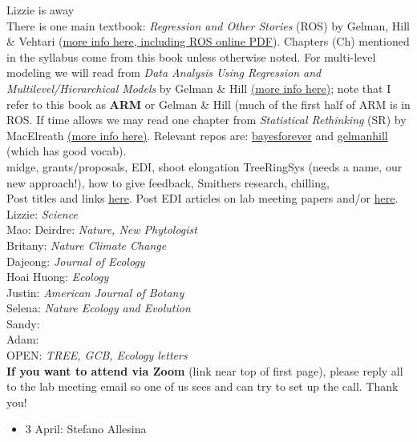 \documentclass[11pt]{article}
\newenvironment{smitemize}{
\begin{itemize}
  \setlength{\itemsep}{0pt}
  \setlength{\parskip}{0.8pt}
  \setlength{\parsep}{0pt}}
{\end{itemize}
}
\begin{document}
\noindent *Lizzie is away \\
There is one main textbook: \emph{Regression and Other Stories} (ROS) by Gelman, Hill \& Vehtari (\href{https://avehtari.github.io/ROS-Examples/}{more info here, including ROS online PDF}). Chapters (Ch) mentioned in the syllabus come from this book unless otherwise noted. For multi-level modeling we will read from \emph{Data Analysis Using Regression and Multilevel/Hierarchical Models} by Gelman \& Hill \href{http://www.stat.columbia.edu/~gelman/arm/}{(more info here)}; note that I refer to this book as {\bf ARM} or Gelman \& Hill (much of the first half of ARM is in ROS. If time allows we may read one chapter from \emph{Statistical Rethinking} (SR) by MacElreath \href{http://xcelab.net/rm/statistical-rethinking/}{(more info here)}. Relevant repos are: \href{https://github.com/temporalecologylab/bayesforever}{bayesforever} and \href{https://github.com/lizzieinvancouver/gelmanhill}{gelmanhill} (which has good vocab). \\
\vspace{6pt}
 midge, grants/proposals, EDI, shoot elongation TreeRingSys (needs a name, our new approach!), how to give feedback, Smithers research, chilling, \\
\vspace{7pt}
 Post titles and links \href{https://docs.google.com/document/d/1j0WdDbjdp8ERLSO7whvtnP-tOblYMlX33TSCXy_uRKo/edit?usp=sharing}{\underline{here}}. Post EDI articles on lab meeting papers and/or  \href{https://docs.google.com/document/d/18VbP-03oD0BsArxYm60g1ZvvFL7IoA3-6rpdHb1eLPw/edit#heading=h.gsqcglkhxkzg}{here}.\\

Lizzie: \emph{Science}\\
Mao:
Deirdre: \emph{Nature, New Phytologist}\\
Britany: \emph{Nature Climate Change}\\
Dajeong: \emph{Journal of Ecology}\\
Hoai Huong: \emph{Ecology}\\
Justin: \emph{American Journal of Botany}\\
Selena: \emph{Nature Ecology and Evolution}\\
Sandy: \\
Adam: \\

OPEN: \emph{TREE, GCB, Ecology letters}\\

{\bf If you want to attend via Zoom} (link near top of first page), please reply all to the lab meeting email so one of us sees and can try to set up the call. Thank you!

\vspace{6pt}
\vspace{-1ex}
\begin{smitemize}
\item 3 April: Stefano Allesina
\end{smitemize}
\end{document}
